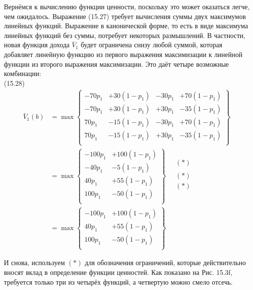\documentclass[10pt,a4paper]{article}
\begin{document}
Вернёмся к вычислению функции ценности, поскольку это может оказаться легче, чем ожидалось. Выражение (15.27) требует вычисления суммы двух максимумов линейных функций. Выражение в канонической форме, то есть в виде максимума линейных функций без суммы, потребует некоторых размышлений. В частности, новая функция дохода $\bar{V}_1$ будет ограничена снизу любой суммой, которая добавляет линейную функцию из первого выражения максимизации к линейной функции из второго выражения максимизации. Это даёт четыре возможные комбинации:\\

(15.28)
\begin{equation*}
\begin{split}
\bar{V}_1(b)&=\max\left\{
\begin{array}{rrrr}
-70p_1&+30(1-p_1)&-30p_1&+70(1-p_1)\\
-70p_1&+30(1-p_1)&+30p_1&-35(1-p_1)\\
70p_1&-15(1-p_1)&-30p_1&+70(1-p_1)\\
70p_1&-15(1-p_1)&+30p_1&-35(1-p_1)\\
\end{array}
\right\}\\
&=\max\left\{
\begin{array}{rr}
-100p_1&+100(1-p_1)\\
-40p_1&-5(1-p_1)\\
40p_1&+55(1-p_1)\\
100p_1&-50(1-p_1)\\
\end{array}
\right\}\quad\begin{array}{c}
(\ast)\\
{}\\
(\ast)\\
(\ast)\\
\end{array}\\
&=\max\left\{
\begin{array}{rr}
-100p_1&+100(1-p_1)\\
40p_1&+55(1-p_1)\\
100p_1&-50(1-p_1)\\
\end{array}
\right\}
\end{split}
\end{equation*}

И снова, используем $(\ast)$ для обозначения ограничений, которые действительно вносят вклад в определение функции ценностей. Как показано на Рис. 15.3f, требуется только три из четырёх функций, а четвертую можно смело отсечь.\\
\end{document}
